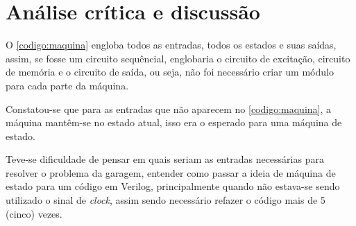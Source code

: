 \chapter{Análise crítica e discussão}
	O \autoref{codigo:maquina} engloba todos as entradas, todos os estados e suas
	saídas, assim, se fosse um circuito sequêncial, englobaria o circuito de
	excitação, circuito de memória e o circuito de saída, ou seja, não foi necessário
	criar um módulo para cada parte da máquina.

	Constatou-se que para as entradas que não aparecem no \autoref{codigo:maquina},
	a máquina mantêm-se no estado atual, isso era o esperado para uma máquina de estado.

	Teve-se dificuldade de pensar em quais seriam as entradas necessárias para resolver
	o problema da garagem, entender como passar a ideia de máquina de estado para um código
	em Verilog, principalmente quando não estava-se sendo utilizado o sinal de \textit{clock},
	assim sendo necessário refazer o código mais de 5 (cinco) vezes.

